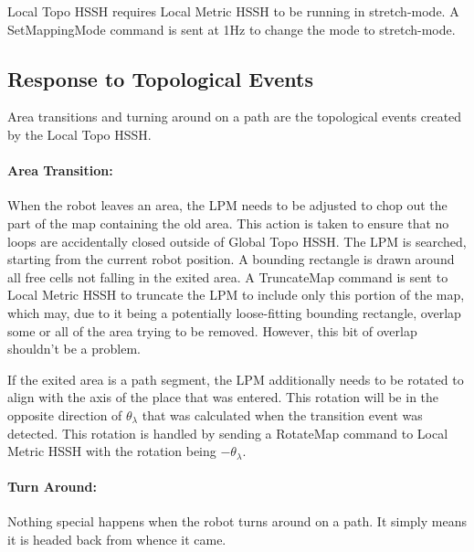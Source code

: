 \documentclass{article}
\begin{document}
Local Topo HSSH requires Local Metric HSSH to be running in stretch-mode. A SetMappingMode command is sent at 1Hz to 
change the mode to stretch-mode.

\subsection{Response to Topological Events}

Area transitions and turning around on a path are the topological events created by the Local Topo HSSH.

\paragraph{Area Transition:}

When the robot leaves an area, the LPM needs to be adjusted to chop out the part of the map containing the old area. 
This action is taken to ensure that no loops are accidentally closed outside of Global Topo HSSH. The LPM is searched, 
starting from the current robot position. A bounding rectangle is drawn around all free cells not falling in the 
exited area. A TruncateMap command is sent to Local Metric HSSH to truncate the LPM to include only this portion of 
the map, which may, due to it being a potentially loose-fitting bounding rectangle, overlap some or all of the area 
trying to be removed. However, this bit of overlap shouldn't be a problem.

If the exited area is a path segment, the LPM additionally needs to be rotated to align with the axis of the place that 
was entered. This rotation will be in the opposite direction of $\theta_\lambda$ that was calculated when the 
transition event was detected. This rotation is handled by sending a RotateMap command to Local Metric HSSH with the 
rotation being $-\theta_\lambda$.

\paragraph{Turn Around:}

Nothing special happens when the robot turns around on a path. It simply means it is headed back from whence it came.
\end{document}
